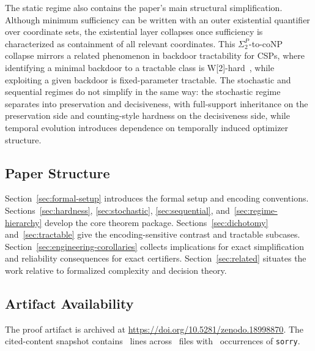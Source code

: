 The static regime also contains the paper's main structural simplification. Although minimum sufficiency can be written with an outer existential quantifier over coordinate sets, the existential layer collapses once sufficiency is characterized as containment of all relevant coordinates. This $\Sigma_2^P$-to-coNP collapse mirrors a related phenomenon in backdoor tractability for CSPs, where identifying a minimal backdoor to a tractable class is W[2]-hard~\cite{bessiere2013detecting}, while exploiting a given backdoor is fixed-parameter tractable. The stochastic and sequential regimes do not simplify in the same way: the stochastic regime separates into preservation and decisiveness, with full-support inheritance on the preservation side and counting-style hardness on the decisiveness side, while temporal evolution introduces dependence on temporally induced optimizer structure.

\subsection{Paper Structure}

Section~\ref{sec:formal-setup} introduces the formal setup and encoding conventions. Sections~\ref{sec:hardness}, \ref{sec:stochastic}, \ref{sec:sequential}, and~\ref{sec:regime-hierarchy} develop the core theorem package. Sections~\ref{sec:dichotomy} and~\ref{sec:tractable} give the encoding-sensitive contrast and tractable subcases. Section~\ref{sec:engineering-corollaries} collects implications for exact simplification and reliability consequences for exact certifiers. Section~\ref{sec:related} situates the work relative to formalized complexity and decision theory.

\subsection{Artifact Availability}

The proof artifact is archived at \url{https://doi.org/10.5281/zenodo.18998870}. The cited-content snapshot contains \LeanReleaseLines\ lines across \LeanReleaseFiles\ files with \LeanReleaseSorry\ occurrences of \texttt{sorry}.
